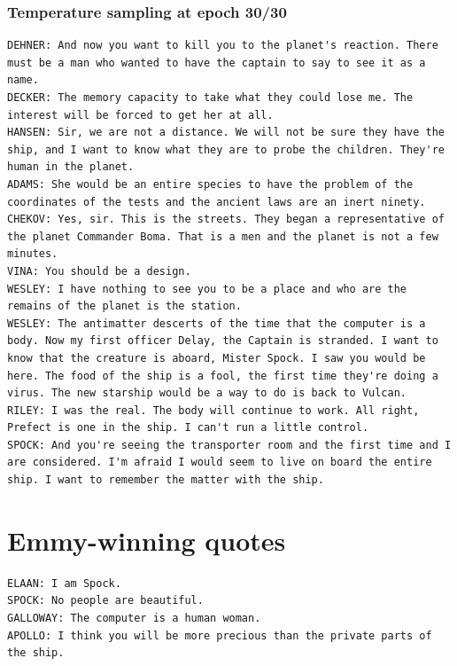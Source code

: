 \documentclass[twocolumn, 9pt]{article}
\begin{document}
\subsubsection*{Temperature sampling at epoch 30/30}
\begin{lstlisting}
DEHNER: And now you want to kill you to the planet's reaction. There must be a man who wanted to have the captain to say to see it as a name.
DECKER: The memory capacity to take what they could lose me. The interest will be forced to get her at all.
HANSEN: Sir, we are not a distance. We will not be sure they have the ship, and I want to know what they are to probe the children. They're human in the planet.
ADAMS: She would be an entire species to have the problem of the coordinates of the tests and the ancient laws are an inert ninety.
CHEKOV: Yes, sir. This is the streets. They began a representative of the planet Commander Boma. That is a men and the planet is not a few minutes.
VINA: You should be a design.
WESLEY: I have nothing to see you to be a place and who are the remains of the planet is the station.
WESLEY: The antimatter descerts of the time that the computer is a body. Now my first officer Delay, the Captain is stranded. I want to know that the creature is aboard, Mister Spock. I saw you would be here. The food of the ship is a fool, the first time they're doing a virus. The new starship would be a way to do is back to Vulcan.
RILEY: I was the real. The body will continue to work. All right, Prefect is one in the ship. I can't run a little control.
SPOCK: And you're seeing the transporter room and the first time and I are considered. I'm afraid I would seem to live on board the entire ship. I want to remember the matter with the ship.
\end{lstlisting}

\section{Emmy-winning quotes}
\begin{lstlisting}
ELAAN: I am Spock.
SPOCK: No people are beautiful.
GALLOWAY: The computer is a human woman.
APOLLO: I think you will be more precious than the private parts of the ship.
\end{lstlisting}
\end{document}
